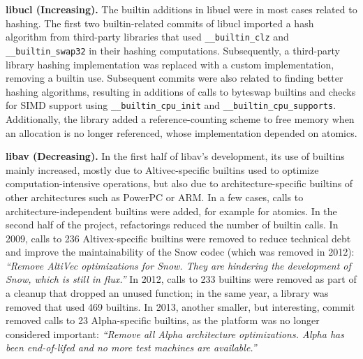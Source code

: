 \documentclass[sigconf,screen]{acmart}
\renewcommand{\paragraph}[1]{\textbf{#1}}
\newcommand\code[1]{\texttt{#1}}
\newcommand\quotecommit[1]{\emph{``#1''}}
\begin{document}
\paragraph{libucl (Increasing).}
The builtin additions in libucl were in most cases related to hashing.
The first two builtin-related commits of libucl imported a hash algorithm from third-party libraries that used \code{\_\_builtin\_clz} and \code{\_\_builtin\_swap32} in their hashing computations.
Subsequently, a third-party library hashing implementation was replaced with a custom implementation, removing a builtin use.
Subsequent commits were also related to finding better hashing algorithms, resulting in additions of calls to byteswap builtins and checks for SIMD support using \code{\_\_builtin\_cpu\_init} and \code{\_\_builtin\_cpu\_supports}.
Additionally, the library added a reference-counting scheme to free memory when an allocation is no longer referenced, whose implementation depended on atomics.


\paragraph{libav (Decreasing).}
In the first half of libav's development, its use of builtins mainly increased, mostly due to Altivec-specific builtins used to optimize computation-intensive operations, but also due to architecture-specific builtins of other architectures such as PowerPC or ARM.
In a few cases, calls to architecture-independent builtins were added, for example for atomics.
In the second half of the project, refactorings reduced the number of builtin calls.
In 2009, calls to 236 Altivex-specific builtins were removed to reduce technical debt and improve the maintainability of the Snow codec (which was removed in 2012): \quotecommit{Remove AltiVec optimizations for Snow. They are hindering the development of Snow, which is still in flux.}
In 2012, calls to 233 builtins were removed as part of a cleanup that dropped an unused function; in the same year, a library was removed that used 469 builtins.
In 2013, another smaller, but interesting, commit removed calls to 23 Alpha-specific builtins, as the platform was no longer considered important: \quotecommit{Remove all Alpha architecture optimizations. Alpha has been end-of-lifed and no more test machines are available.}
\end{document}
